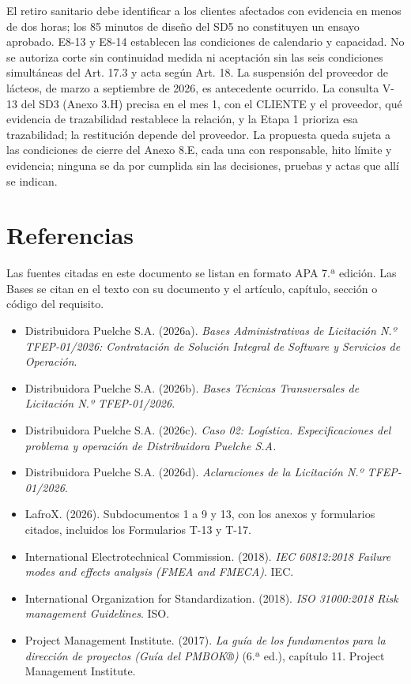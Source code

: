 El retiro sanitario debe identificar a los clientes afectados con evidencia en menos de dos horas; los 85 minutos de diseño del SD5 no constituyen un ensayo aprobado. E8-13 y E8-14 establecen las condiciones de calendario y capacidad. No se autoriza corte sin continuidad medida ni aceptación sin las seis condiciones simultáneas del Art. 17.3 y acta según Art. 18. La suspensión del proveedor de lácteos, de marzo a septiembre de 2026, es antecedente ocurrido. La consulta V-13 del SD3 (Anexo 3.H) precisa en el mes 1, con el CLIENTE y el proveedor, qué evidencia de trazabilidad restablece la relación, y la Etapa 1 prioriza esa trazabilidad; la restitución depende del proveedor. La propuesta queda sujeta a las condiciones de cierre del Anexo 8.E, cada una con responsable, hito límite y evidencia; ninguna se da por cumplida sin las decisiones, pruebas y actas que allí se indican.

\section*{Referencias}

Las fuentes citadas en este documento se listan en formato APA 7.ª edición. Las Bases se citan en el texto con su documento y el artículo, capítulo, sección o código del requisito.

\begin{itemize}[leftmargin=*,itemsep=3pt]
\item Distribuidora Puelche S.A. (2026a). \emph{Bases Administrativas de Licitación N.º TFEP-01/2026: Contratación de Solución Integral de Software y Servicios de Operación}.
\item Distribuidora Puelche S.A. (2026b). \emph{Bases Técnicas Transversales de Licitación N.º TFEP-01/2026}.
\item Distribuidora Puelche S.A. (2026c). \emph{Caso 02: Logística. Especificaciones del problema y operación de Distribuidora Puelche S.A.}
\item Distribuidora Puelche S.A. (2026d). \emph{Aclaraciones de la Licitación N.º TFEP-01/2026}.
\item LafroX. (2026). Subdocumentos 1 a 9 y 13, con los anexos y formularios citados, incluidos los Formularios T-13 y T-17.
\item International Electrotechnical Commission. (2018). \emph{IEC 60812:2018 Failure modes and effects analysis (FMEA and FMECA)}. IEC.
\item International Organization for Standardization. (2018). \emph{ISO 31000:2018 Risk management \textemdash{} Guidelines}. ISO.
\item Project Management Institute. (2017). \emph{La guía de los fundamentos para la dirección de proyectos (Guía del PMBOK®)} (6.ª ed.), capítulo 11. Project Management Institute.
\end{itemize}

